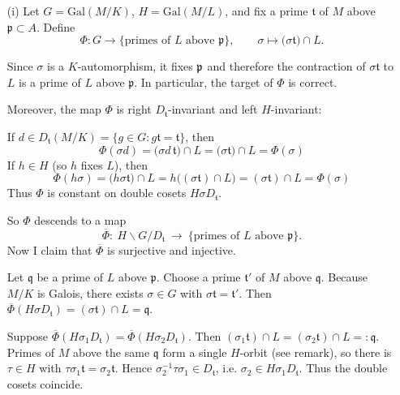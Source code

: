\documentclass[12pt]{article}  %
\begin{document}
\begin{solution}
    \begin{enumerate}
        \item[(i)] Let $G=\mathrm{Gal}(M/K)$, $H=\mathrm{Gal}(M/L)$, and fix a prime $\mathfrak{t}$ of $M$ above $\mathfrak{p}\subset A$.
              Define
              \[\Phi:G\longrightarrow\{\text{primes of }L\text{ above }\mathfrak{p}\},\qquad
                  \sigma\longmapsto \big(\sigma\mathfrak{t}\big)\cap L.\]

              Since $\sigma$ is a $K$-automorphism, it fixes $\mathfrak{p}$ and therefore the contraction of $\sigma\mathfrak{t}$ to $L$ is a prime of $L$ above $\mathfrak{p}$. In particular, the target of $\Phi$ is correct.

              Moreover, the map $\Phi$ is right $D_{\mathfrak{t}}$-invariant and left $H$-invariant:

              If $d\in D_{\mathfrak{t}}(M/K)=\{g\in G:g\mathfrak{t}=\mathfrak{t}\}$, then \[\Phi(\sigma d)=\big(\sigma d\,\mathfrak{t}\big)\cap L=\big(\sigma\mathfrak{t}\big)\cap L=\Phi(\sigma)\]
              If $h\in H$ (so $h$ fixes $L$), then
              \[\Phi(h\sigma)=\big(h\sigma\mathfrak{t}\big)\cap L
                  =h\big((\sigma\mathfrak{t})\cap L\big)
                  =(\sigma\mathfrak{t})\cap L=\Phi(\sigma)\]
              Thus $\Phi$ is constant on double cosets $H\sigma D_{\mathfrak{t}}$.

              So $\Phi$ descends to a map
              \[\overline\Phi:\ H\backslash G/D_{\mathfrak{t}}\ \longrightarrow\ \{\text{primes of }L\text{ above }\mathfrak{p}\}.\]
              Now I claim that $\overline\Phi$ is surjective and injective.

              Let $\mathfrak{q}$ be a prime of $L$ above $\mathfrak{p}$. Choose a prime $\mathfrak{t}'$ of $M$ above $\mathfrak{q}$. Because $M/K$ is Galois, there exists $\sigma\in G$ with $\sigma\mathfrak{t}=\mathfrak{t}'$. Then
              $\overline\Phi(H\sigma D_{\mathfrak{t}})=(\sigma\mathfrak{t})\cap L=\mathfrak{q}$.

              Suppose $\overline\Phi(H\sigma_1 D_{\mathfrak{t}})=\overline\Phi(H\sigma_2 D_{\mathfrak{t}})$. Then
              $(\sigma_1\mathfrak{t})\cap L=(\sigma_2\mathfrak{t})\cap L=: \mathfrak{q}$.
              Primes of $M$ above the same $\mathfrak{q}$ form a single $H$-orbit (see remark), so there is $\tau\in H$ with
              $\tau\sigma_1\mathfrak{t}=\sigma_2\mathfrak{t}$. Hence $\sigma_2^{-1}\tau\sigma_1\in D_{\mathfrak{t}}$, i.e.
              $\sigma_2\in H\sigma_1 D_{\mathfrak{t}}$. Thus the double cosets coincide.


\end{enumerate}
\end{solution}
\end{document}
